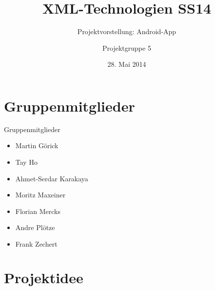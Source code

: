 \documentclass[ucs,9pt]{beamer}
\title{XML-Technologien SS14}
\subtitle{Projektvorstellung: Android-App}
\author{Projektgruppe 5}
\institute{Freie Universität Berlin}
\date{28. Mai 2014}
\begin{document}
\begin{frame}[plain]
  \titlepage
\end{frame}

\section{Gruppenmitglieder}

\begin{frame}{Gruppenmitglieder}
	\begin{itemize}
	\item Martin Görick
	\item Tay Ho
	\item Ahmet-Serdar Karakaya
	\item Moritz Maxeiner
	\item Florian Mercks
	\item Andre Plötze
	\item Frank Zechert
	\end{itemize}
\end{frame}

\section{Projektidee}
\end{document}
